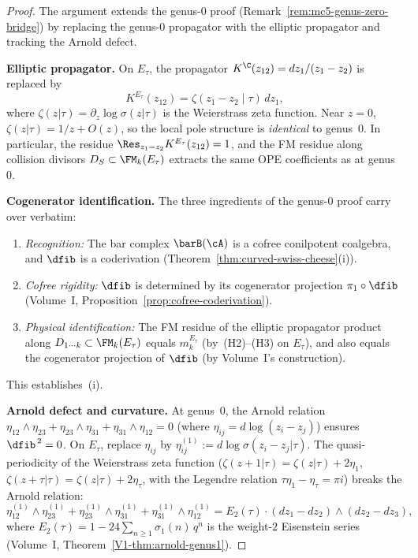 \begin{proof}
The argument extends the genus-$0$ proof
(Remark~\ref{rem:mc5-genus-zero-bridge}) by replacing the
genus-$0$ propagator with the elliptic propagator and tracking the
Arnold defect.

\textbf{Elliptic propagator.}
On $E_\tau$, the propagator $K^{\C}(z_{12}) = dz_1/(z_1 - z_2)$ is
replaced by
\[
K^{E_\tau}(z_{12})
= \zeta(z_1 - z_2 \mid \tau)\,dz_1,
\]
where $\zeta(z|\tau) = \partial_z \log\sigma(z|\tau)$ is the
Weierstrass zeta function. Near $z = 0$,
$\zeta(z|\tau) = 1/z + O(z)$, so the local pole structure is
\emph{identical} to genus~$0$. In particular, the residue
$\Res_{z_1 = z_2} K^{E_\tau}(z_{12}) = 1$, and the FM residue
along collision divisors $D_S \subset \FM_k(E_\tau)$ extracts the
same OPE coefficients as at genus~$0$.

\textbf{Cogenerator identification.}
The three ingredients of the genus-$0$ proof carry over verbatim:
\begin{enumerate}[label=(\alph*)]
\item \emph{Recognition:} The bar complex $\barB(\cA)$ is a cofree
 conilpotent coalgebra, and $\dfib$ is a coderivation
 (Theorem~\ref{thm:curved-swiss-cheese}(i)).
\item \emph{Cofree rigidity:} $\dfib$ is determined by its
 cogenerator projection $\pi_1 \circ \dfib$
 (Volume~I, Proposition~\ref*{prop:cofree-coderivation}).
\item \emph{Physical identification:} The FM residue of the
 elliptic propagator product along
 $D_{1\cdots k} \subset \FM_k(E_\tau)$ equals $m_k^{E_\tau}$
 (by~(H2)--(H3) on $E_\tau$), and also equals the cogenerator
 projection of $\dfib$ (by Volume~I's construction).
\end{enumerate}
This establishes~(i).

\textbf{Arnold defect and curvature.}
At genus~$0$, the Arnold relation
$\eta_{12} \wedge \eta_{23} + \eta_{23} \wedge \eta_{31}
+ \eta_{31} \wedge \eta_{12} = 0$ (where
$\eta_{ij} = d\log(z_i - z_j)$) ensures $\dfib^{\,2} = 0$.
On $E_\tau$, replace $\eta_{ij}$ by
$\eta_{ij}^{(1)} := d\log\sigma(z_i - z_j|\tau)$. The
quasi-periodicity of the Weierstrass zeta function
($\zeta(z + 1|\tau) = \zeta(z|\tau) + 2\eta_1$,
$\zeta(z + \tau|\tau) = \zeta(z|\tau) + 2\eta_\tau$,
with the Legendre relation
$\tau\eta_1 - \eta_\tau = \pi i$) breaks the Arnold relation:
\[
\eta_{12}^{(1)} \wedge \eta_{23}^{(1)}
+ \eta_{23}^{(1)} \wedge \eta_{31}^{(1)}
+ \eta_{31}^{(1)} \wedge \eta_{12}^{(1)}
= E_2(\tau) \cdot (dz_1 - dz_2) \wedge (dz_2 - dz_3),
\]
where $E_2(\tau) = 1 - 24\sum_{n \geq 1} \sigma_1(n)\,q^n$ is the
weight-$2$ Eisenstein series
(Volume~I, Theorem~\ref*{V1-thm:arnold-genus1}).


\end{proof}
